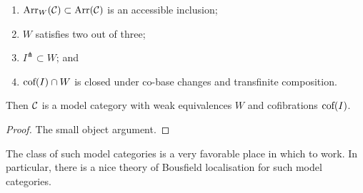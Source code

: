 \documentclass[11pt]{article}
\begin{document}
\begin{JeremyModelCategories}
\begin{thm*}
\begin{enumerate}\squishlist
\item $\textup{Arr}_W(\mathcal{C})\subset\textup{Arr}(\mathcal{C})$ is an accessible inclusion;
\item $W$ satisfies two out of three;
\item $I^\pitchfork\subset W$; and
\item $\textup{cof}(I)\cap W$ is closed under co-base changes and transfinite composition.
\end{enumerate}
Then $\mathcal{C}$ is a model category with weak equivalences $W$ and cofibrations $\textup{cof}(I)$.
\end{thm*}
\begin{proof}
The small object argument.
\end{proof}
\noindent The class of such model categories is a very favorable place in which to work. In particular, there is a nice theory of Bousfield localisation for such model categories.

\pagebreak
\end{JeremyModelCategories}
\end{document}

